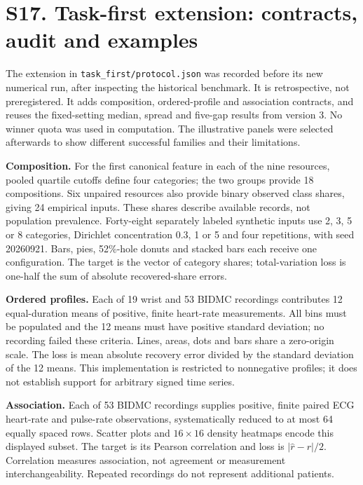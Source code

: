 \documentclass[10pt]{article}
\begin{document}
\clearpage
\section*{S17. Task-first extension: contracts, audit and examples}
The extension in \texttt{task\_first/protocol.json} was recorded before its new numerical run, after inspecting the historical benchmark. It is retrospective, not preregistered. It adds composition, ordered-profile and association contracts, and reuses the fixed-setting median, spread and five-gap results from version 3. No winner quota was used in computation. The illustrative panels were selected afterwards to show different successful families and their limitations.

\textbf{Composition.} For the first canonical feature in each of the nine resources, pooled quartile cutoffs define four categories; the two groups provide 18 compositions. Six unpaired resources also provide binary observed class shares, giving 24 empirical inputs. These shares describe available records, not population prevalence. Forty-eight separately labeled synthetic inputs use 2, 3, 5 or 8 categories, Dirichlet concentration 0.3, 1 or 5 and four repetitions, with seed 20260921. Bars, pies, 52\%-hole donuts and stacked bars each receive one configuration. The target is the vector of category shares; total-variation loss is one-half the sum of absolute recovered-share errors.

\textbf{Ordered profiles.} Each of 19 wrist and 53 BIDMC recordings contributes 12 equal-duration means of positive, finite heart-rate measurements. All bins must be populated and the 12 means must have positive standard deviation; no recording failed these criteria. Lines, areas, dots and bars share a zero-origin scale. The loss is mean absolute recovery error divided by the standard deviation of the 12 means. This implementation is restricted to nonnegative profiles; it does not establish support for arbitrary signed time series.

\textbf{Association.} Each of 53 BIDMC recordings supplies positive, finite paired ECG heart-rate and pulse-rate observations, systematically reduced to at most 64 equally spaced rows. Scatter plots and $16\times16$ density heatmaps encode this displayed subset. The target is its Pearson correlation and loss is $|\hat r-r|/2$. Correlation measures association, not agreement or measurement interchangeability. Repeated recordings do not represent additional patients.
\end{document}
